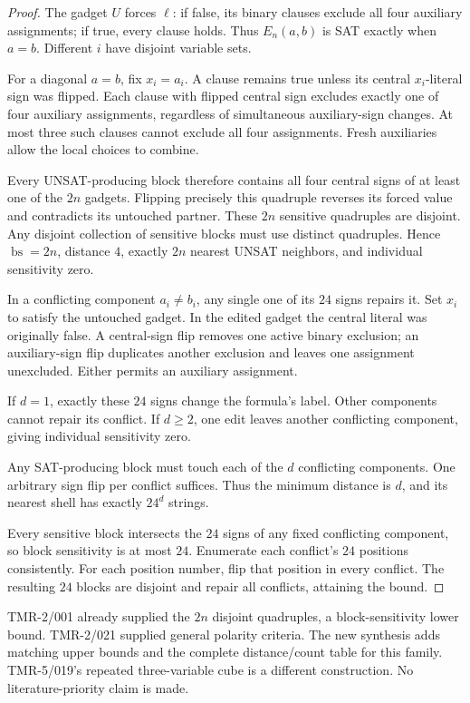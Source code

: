 \documentclass[11pt]{article}
\newcommand{\bs}{\operatorname{bs}}
\begin{document}
\begin{proof}
The gadget \(U\) forces \(\ell\): if false, its binary clauses exclude all four auxiliary assignments; if true, every clause holds. Thus \(E_n(a,b)\) is SAT exactly when \(a=b\). Different \(i\) have disjoint variable sets.

For a diagonal \(a=b\), fix \(x_i=a_i\). A clause remains true unless its central \(x_i\)-literal sign was flipped. Each clause with flipped central sign excludes exactly one of four auxiliary assignments, regardless of simultaneous auxiliary-sign changes. At most three such clauses cannot exclude all four assignments. Fresh auxiliaries allow the local choices to combine.

Every UNSAT-producing block therefore contains all four central signs of at least one of the \(2n\) gadgets. Flipping precisely this quadruple reverses its forced value and contradicts its untouched partner. These \(2n\) sensitive quadruples are disjoint. Any disjoint collection of sensitive blocks must use distinct quadruples. Hence \(\bs=2n\), distance \(4\), exactly \(2n\) nearest UNSAT neighbors, and individual sensitivity zero.

In a conflicting component \(a_i\ne b_i\), any single one of its \(24\) signs repairs it. Set \(x_i\) to satisfy the untouched gadget. In the edited gadget the central literal was originally false. A central-sign flip removes one active binary exclusion; an auxiliary-sign flip duplicates another exclusion and leaves one assignment unexcluded. Either permits an auxiliary assignment.

If \(d=1\), exactly these \(24\) signs change the formula's label. Other components cannot repair its conflict. If \(d\ge2\), one edit leaves another conflicting component, giving individual sensitivity zero.

Any SAT-producing block must touch each of the \(d\) conflicting components. One arbitrary sign flip per conflict suffices. Thus the minimum distance is \(d\), and its nearest shell has exactly \(24^d\) strings.

Every sensitive block intersects the \(24\) signs of any fixed conflicting component, so block sensitivity is at most \(24\). Enumerate each conflict's \(24\) positions consistently. For each position number, flip that position in every conflict. The resulting \(24\) blocks are disjoint and repair all conflicts, attaining the bound.
\end{proof}

TMR-2/001 already supplied the \(2n\) disjoint quadruples, a block-sensitivity lower bound. TMR-2/021 supplied general polarity criteria. The new synthesis adds matching upper bounds and the complete distance/count table for this family. TMR-5/019's repeated three-variable cube is a different construction. No literature-priority claim is made.
\end{document}
